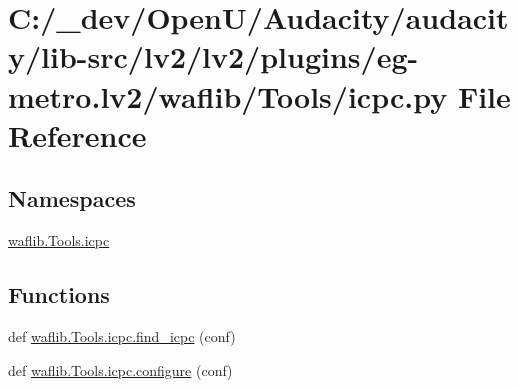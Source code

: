 \hypertarget{lv2_2plugins_2eg-metro_8lv2_2waflib_2_tools_2icpc_8py}{}\section{C\+:/\+\_\+dev/\+Open\+U/\+Audacity/audacity/lib-\/src/lv2/lv2/plugins/eg-\/metro.lv2/waflib/\+Tools/icpc.py File Reference}
\label{lv2_2plugins_2eg-metro_8lv2_2waflib_2_tools_2icpc_8py}
\subsection*{Namespaces}
\begin{DoxyCompactItemize}
\item 
 \hyperlink{namespacewaflib_1_1_tools_1_1icpc}{waflib.\+Tools.\+icpc}
\end{DoxyCompactItemize}
\subsection*{Functions}
\begin{DoxyCompactItemize}
\item 
def \hyperlink{namespacewaflib_1_1_tools_1_1icpc_a3f1e8dd3ca1313cf570316c73027db11}{waflib.\+Tools.\+icpc.\+find\+\_\+icpc} (conf)
\item 
def \hyperlink{namespacewaflib_1_1_tools_1_1icpc_ac5e97f409d9392b945bef908e0e7f9cd}{waflib.\+Tools.\+icpc.\+configure} (conf)
\end{DoxyCompactItemize}
